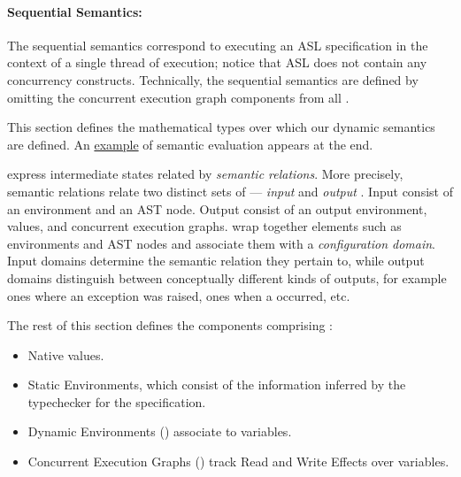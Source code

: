 \paragraph{Sequential Semantics:}
The sequential semantics correspond to executing an ASL specification in the context of a single thread
of execution; notice that ASL does not contain any concurrency constructs.
%
Technically, the sequential semantics are defined by omitting the concurrent execution graph components
from all \semanticsconfigurationsterm{}.

This section defines the mathematical types over which our dynamic semantics are defined.
An \hyperlink{eval-example}{example} of semantic evaluation appears at the end.

\Semanticsconfigurationsterm{} express intermediate states related by \emph{semantic relations}.
%
More precisely, semantic relations relate two distinct sets of \semanticsconfigurationsterm{} ---
\emph{input \semanticsconfigurationsterm{}} and \emph{output \semanticsconfigurationsterm{}}.
Input \semanticsconfigurationsterm{} consist of an environment and an AST node.
Output \semanticsconfigurationsterm{} consist of an output environment, values,
and concurrent execution graphs.
%
\Semanticsconfigurationsterm{} wrap together elements such as environments and AST nodes
and associate them with a \emph{configuration domain}. Input \semanticsconfigurationterm{} domains
determine the semantic relation they pertain to, while output \semanticsconfigurationterm{}
domains distinguish between conceptually different kinds of outputs, for example
ones where an exception was raised, ones when a \dynamicerrorterm{} occurred, etc.

The rest of this section defines the components comprising \semanticsconfigurationsterm{}:
\begin{itemize}
    \item Native values.
    \item Static Environments, which consist of the information inferred
            by the typechecker for the specification.
    \item Dynamic Environments () associate \nativevaluesterm{} to variables.
    \item Concurrent Execution Graphs () track Read and Write Effects over variables.
\end{itemize}

